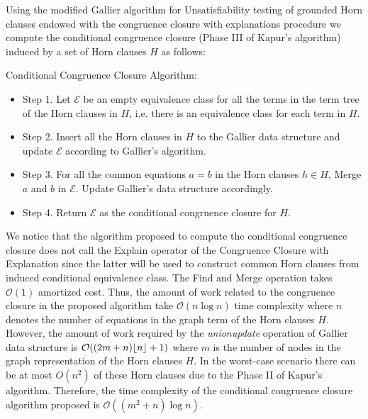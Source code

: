     


Using the modified Gallier algorithm for Unsatisfiability testing of
grounded Horn clauses endowed with the congruence
closure with explanations procedure we compute the conditional
congruence closure (Phase III of Kapur's algorithm) induced
by a set of Horn clauses $H$ as follows:

Conditional Congruence Closure Algorithm: \label{ccc_algorithm} \\
\begin{itemize} 
  \item[] Step 1. Let $\mathcal{E}$ be an empty equivalence class
    for all the terms in the term tree of the Horn clauses in $H$,
    i.e. there is an equivalence class for each term in $H$.

  \item[] Step 2. Insert all the Horn clauses in $H$ to the Gallier
    data structure and update $\mathcal{E}$ according to Gallier's
    algorithm.

  \item[] Step 3. For all the common equations $a = b$ 
    in the Horn clauses $h \in H$, Merge $a$ and $b$ in 
    $\mathcal{E}$. Update Gallier's data structure
    accordingly.

  \item[] Step 4. Return $\mathcal{E}$ as the conditional
    congruence closure for $H$.
\end{itemize}


We notice that the algorithm proposed to compute the 
conditional congruence closure does not call the Explain
operator of the Congruence Closure with Explanation since
the latter will be used to construct common Horn clauses
from induced conditional equivalence class. The Find and Merge
operation takes $\mathcal{O}(1)$ amortized cost. Thus, 
the amount of work related to the congruence closure
in the proposed algorithm take $\mathcal{O}(n \log n)$ time complexity
where $n$ denotes the number of equations in the graph term 
of the Horn clauses $H$.
However, the amount of work required by the \emph{unionupdate}
operation of Gallier data structure is $\mathcal{O}(
(2 m + n)\lfloor n \rfloor + 1)$ where $m$ is the number of nodes 
in the graph representation of the Horn clauses $H$. In 
the worst-case scenario there can be at most $O(n^2)$
of these Horn clauses due to the Phase II of Kapur's algorithm.
Therefore, the time complexity of the conditional
congruence closure algorithm proposed is
$\mathcal{O}((m^2 + n)\log n)$.


